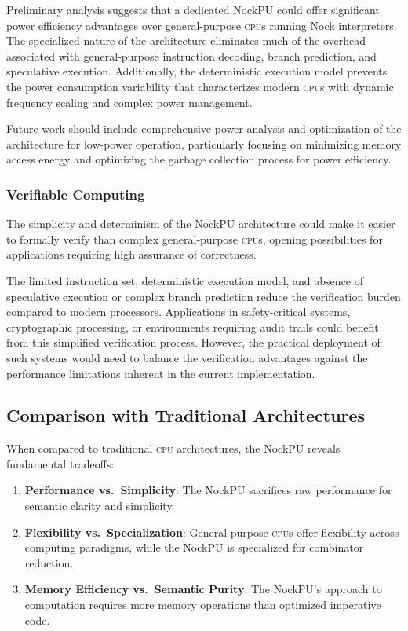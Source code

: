 \documentclass[twoside]{article}
\begin{document}
Preliminary analysis suggests that a dedicated NockPU could offer significant power efficiency advantages over general-purpose \textsc{cpu}s running Nock interpreters. The specialized nature of the architecture eliminates much of the overhead associated with general-purpose instruction decoding, branch prediction, and speculative execution. Additionally, the deterministic execution model prevents the power consumption variability that characterizes modern \textsc{cpu}s with dynamic frequency scaling and complex power management.

Future work should include comprehensive power analysis and optimization of the architecture for low-power operation, particularly focusing on minimizing memory access energy and optimizing the garbage collection process for power efficiency.

\subsubsection{Verifiable Computing}

The simplicity and determinism of the NockPU architecture could make it easier to formally verify than complex general-purpose \textsc{cpu}s, opening possibilities for applications requiring high assurance of correctness.

The limited instruction set, deterministic execution model, and absence of speculative execution or complex branch prediction reduce the verification burden compared to modern processors. Applications in safety-critical systems, cryptographic processing, or environments requiring audit trails could benefit from this simplified verification process. However, the practical deployment of such systems would need to balance the verification advantages against the performance limitations inherent in the current implementation.

\subsection{Comparison with Traditional Architectures}

When compared to traditional \textsc{cpu} architectures, the NockPU reveals fundamental tradeoffs:

\begin{enumerate}
  \item \textbf{Performance vs.\ Simplicity}: The NockPU sacrifices raw performance for semantic clarity and simplicity.
  \item \textbf{Flexibility vs.\ Specialization}: General-purpose \textsc{cpu}s offer flexibility across computing paradigms, while the NockPU is specialized for combinator reduction.
  \item \textbf{Memory Efficiency vs.\ Semantic Purity}: The NockPU's approach to computation requires more memory operations than optimized imperative code.
\end{enumerate}
\end{document}
